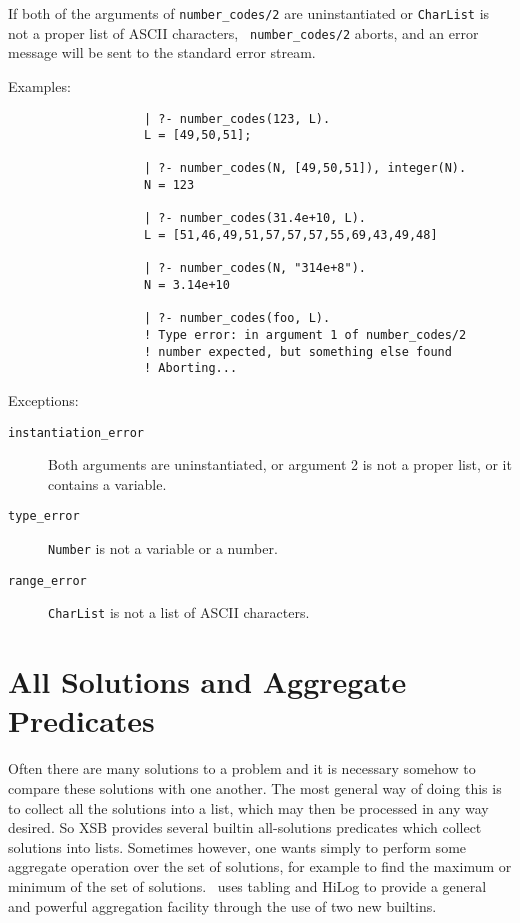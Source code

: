 \begin{description}
    If both of the arguments of {\tt number\_codes/2} are uninstantiated or
    {\tt CharList} is not a proper list of ASCII characters, {\tt
    number\_codes/2} aborts, and an error message will be sent to
    the standard error stream.

    Examples:
    {\footnotesize
     \begin{verbatim}
                   | ?- number_codes(123, L).
                   L = [49,50,51];

                   | ?- number_codes(N, [49,50,51]), integer(N).
                   N = 123

                   | ?- number_codes(31.4e+10, L).
                   L = [51,46,49,51,57,57,57,55,69,43,49,48]

                   | ?- number_codes(N, "314e+8").
                   N = 3.14e+10

                   | ?- number_codes(foo, L).
                   ! Type error: in argument 1 of number_codes/2
                   ! number expected, but something else found
                   ! Aborting...
     \end{verbatim}}

    Exceptions:
    \begin{description}
    \item[{\tt instantiation\_error}]
	Both arguments are uninstantiated, or argument 2
	is not a proper list, or it contains a variable.
    \item[{\tt type\_error}]
	{\tt Number} is not a variable or a number.
    \item[{\tt range\_error}]
	{\tt CharList} is not a list of ASCII characters.
    \end{description}

\end{description}


\section{All Solutions and Aggregate Predicates}
 
Often there are many solutions to a problem and it is necessary
somehow to compare these solutions with one another.  The most general
way of doing this is to collect all the solutions into a list, which
may then be processed in any way desired.  So XSB provides several
builtin all-solutions predicates which collect solutions into lists.
Sometimes however, one wants simply to perform some aggregate
operation over the set of solutions, for example to find the maximum
or minimum of the set of solutions.  \ourprolog\ uses tabling and
HiLog to provide a general and powerful aggregation facility through
the use of two new builtins.


